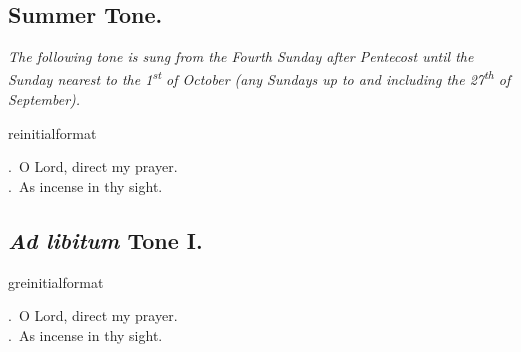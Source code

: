 \documentclass[12pt]{article} %
\newcommand{\myaboveinitial}[1]{%
    \expandafter\renewcommand\csname greinitialformat\endcsname[1]{%
        \fontsize{43}{43}\selectfont ##1
    }
    \gresetfirstlineaboveinitial{\textcolor{benred8}{\raisebox{6.0mm}{\small \textsc{\textbf{#1}}}}}{}
}
\newenvironment{rubric}{\vspace{1 mm}\color{benred8} \itshape \leftskip 0in \setlength{\parindent}{0.25in}}{\vspace{1 mm}}
\newenvironment{response}{\leftskip 0in \setlength{\parindent}{0in}}{\vspace{1 mm}}
\let\oldVbar\Vbar
\renewcommand{\Vbar}{\textcolor{benred8}{\oldVbar .}}
\let\oldRbar\Rbar
\renewcommand{\Rbar}{\textcolor{benred8}{\oldRbar .}}
\begin{document}
\begin{pages}
\begin{Rightside}
\pend\pstart


\subsection*{Summer Tone.}

\pend\pstart

\begin{rubric}
The following tone is sung from the Fourth Sunday after Pentecost until the Sunday nearest to the 1\textsuperscript{st} of October (any Sundays up to and including the 27\textsuperscript{th} of September).

\end{rubric}

\pend\pstart


\myaboveinitial{VIII}

\pend\pstart

\begin{response}
\Vbar\ O Lord, direct my prayer.\\
\Rbar\ As incense in thy sight.

\end{response}

\pend\pstart


\subsection*{\emph{Ad libitum} Tone I.}

\pend\pstart


\myaboveinitial{VIII}

\pend\pstart

\begin{response}
\Vbar\ O Lord, direct my prayer.\\
\Rbar\ As incense in thy sight.

\end{response}

\pend\pstart



\end{Rightside}
\end{pages}
\end{document}
